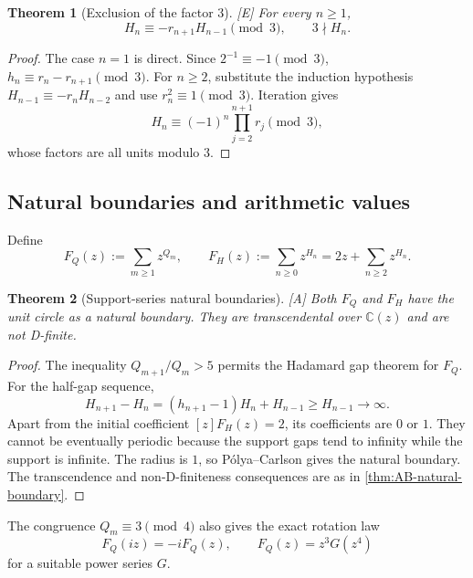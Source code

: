 \documentclass[11pt]{article}
\newtheorem{theorem}{Theorem}[section]
\theoremstyle{definition}
\theoremstyle{remark}
\newcommand{\status}[1]{\textnormal{\textcolor{accent}{\footnotesize[#1]}}}
\begin{document}
\begin{theorem}[Exclusion of the factor $3$]\label{thm:H-mod3}
\status{E}
For every $n\ge1$,
\begin{equation}\label{eq:H-mod3}
 H_n\equiv-r_{n+1}H_{n-1}\pmod3,\qquad 3\nmid H_n.
\end{equation}
\end{theorem}

\begin{proof}
The case $n=1$ is direct.  Since $2^{-1}\equiv-1\pmod3$,
$h_n\equiv r_n-r_{n+1}\pmod3$.  For $n\ge2$, substitute the induction hypothesis
$H_{n-1}\equiv-r_nH_{n-2}$ and use $r_n^2\equiv1\pmod3$.  Iteration gives
\[
 H_n\equiv(-1)^n\prod_{j=2}^{n+1}r_j\pmod3,
\]
whose factors are all units modulo $3$.
\end{proof}

\subsection{Natural boundaries and arithmetic values}

Define
\begin{equation}\label{eq:FQ-FH}
 F_Q(z):=\sum_{m\ge1}z^{Q_m},
 \qquad
 F_H(z):=\sum_{n\ge0}z^{H_n}
          =2z+\sum_{n\ge2}z^{H_n}.
\end{equation}

\begin{theorem}[Support-series natural boundaries]\label{thm:FQ-FH-natural}
\status{A}
Both $F_Q$ and $F_H$ have the unit circle as a natural boundary.  They are
transcendental over $\mathbb C(z)$ and are not D-finite.
\end{theorem}

\begin{proof}
The inequality $Q_{m+1}/Q_m>5$ permits the Hadamard gap theorem for $F_Q$.  For the
half-gap sequence,
\[
 H_{n+1}-H_n=(h_{n+1}-1)H_n+H_{n-1}\ge H_{n-1}\to\infty.
\]
Apart from the initial coefficient $[z]F_H(z)=2$, its coefficients are $0$ or $1$.
They cannot be eventually periodic because the support gaps tend to infinity while the
support is infinite.  The radius is $1$, so P\'olya--Carlson gives the natural boundary.
The transcendence and non-D-finiteness consequences are as in
\cref{thm:AB-natural-boundary}.
\end{proof}

The congruence $Q_m\equiv3\pmod4$ also gives the exact rotation law
\begin{equation}\label{eq:FQ-rotation}
 F_Q(iz)=-iF_Q(z),\qquad F_Q(z)=z^3G(z^4)
\end{equation}
for a suitable power series $G$.
\end{document}
